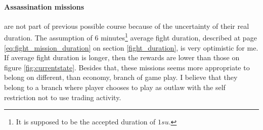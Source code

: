 \documentclass[]{article}
\begin{document}
\paragraph{Assassination missions} are not part of previous possible course because of the uncertainty of their real duration. The assumption of 6 minutes\footnote{It is supposed to be the accepted duration of $1su.$} average fight duration,  described at page \ref{eq:fight_mission_duration} on section \ref{fight_duration}, is very optimistic for me. If average fight duration is longer, then the rewards are lower than those on figure \ref{fig:currentstate}. Besides that, these missions seems more appropriate to belong on different, than economy, branch of game play. I believe that they belong to a branch where player chooses to play as outlaw with the self restriction not to use trading activity. 
\end{document}
